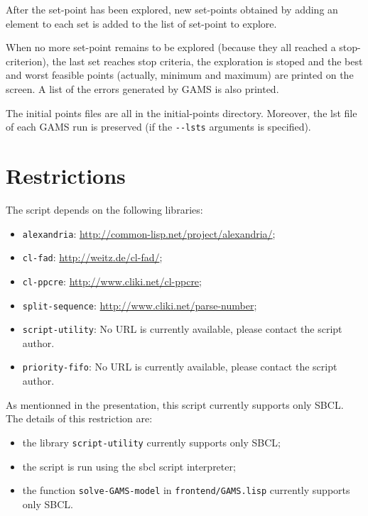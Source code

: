 After the set-point has been explored, new set-points obtained by adding an
element to each set is added to the list of set-point to explore.

When no more set-point remains to be explored (because they all reached a
stop-criterion), the last set reaches stop criteria, the exploration is stoped
and the best and worst feasible points (actually, minimum and maximum) are
printed on the screen. A list of the errors generated by GAMS is also printed.

The initial points files are all in the initial-points directory. Moreover, the
lst file of each GAMS run is preserved (if the \texttt{-{}-lsts} arguments is
specified).

\section*{Restrictions}

The script depends on the following libraries:
\begin{itemize}
\item \texttt{alexandria}: \url{http://common-lisp.net/project/alexandria/};
\item \texttt{cl-fad}: \url{http://weitz.de/cl-fad/};
\item \texttt{cl-ppcre}: \url{http://www.cliki.net/cl-ppcre};
\item \texttt{split-sequence}: \url{http://www.cliki.net/parse-number};
\item \texttt{script-utility}: No URL is currently available, please contact the
  script author.
\item \texttt{priority-fifo}: No URL is currently available, please contact the
  script author.
\end{itemize}

As mentionned in the presentation, this script currently supports only SBCL.
The details of this restriction are:
\begin{itemize}
\item the library \texttt{script-utility} currently supports only SBCL;
\item the script is run using the sbcl script interpreter;
\item the function \texttt{solve-GAMS-model} in \texttt{frontend/GAMS.lisp}
  currently supports only SBCL.
\end{itemize}
